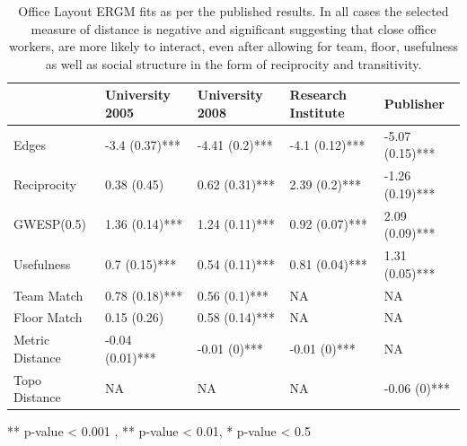\documentclass[
]{statsoc}
\begin{document}
\begin{table}

\caption{\label{tab:unnamed-chunk-2}\label{tab:sailer_ergm_pub} Office Layout ERGM fits as per the published results. In all cases the selected measure of distance is negative and significant suggesting that close office workers, are more likely to interact, even after allowing for team, floor, usefulness as well as social structure in the form of reciprocity and transitivity.}
\centering
\begin{threeparttable}
\begin{tabular}[t]{lllll}
\toprule
  & University 2005 & University 2008 & Research Institute & Publisher\\
\midrule
\rowcolor{gray!6}  Edges & -3.4 (0.37)*** & -4.41 (0.2)*** & -4.1 (0.12)*** & -5.07 (0.15)***\\
Reciprocity & 0.38 (0.45) & 0.62 (0.31)*** & 2.39 (0.2)*** & -1.26 (0.19)***\\
\rowcolor{gray!6}  GWESP(0.5) & 1.36 (0.14)*** & 1.24 (0.11)*** & 0.92 (0.07)*** & 2.09 (0.09)***\\
Usefulness & 0.7 (0.15)*** & 0.54 (0.11)*** & 0.81 (0.04)*** & 1.31 (0.05)***\\
\rowcolor{gray!6}  Team Match & 0.78 (0.18)*** & 0.56 (0.1)*** & NA & NA\\
\addlinespace
Floor Match & 0.15 (0.26) & 0.58 (0.14)*** & NA & NA\\
\rowcolor{gray!6}  Metric Distance & -0.04 (0.01)*** & -0.01 (0)*** & -0.01 (0)*** & NA\\
Topo Distance & NA & NA & NA & -0.06 (0)***\\
\bottomrule
\end{tabular}
\begin{tablenotes}
\item *** p-value < 0.001 , ** p-value < 0.01, * p-value < 0.5
\end{tablenotes}
\end{threeparttable}
\end{table}
\end{document}
